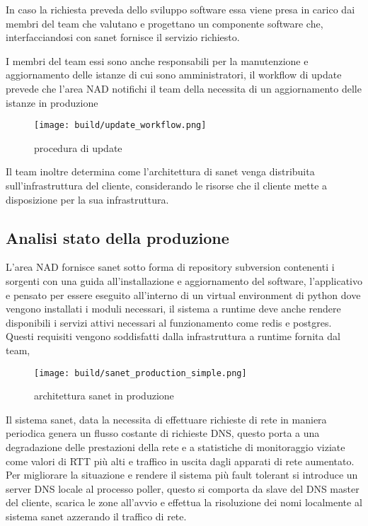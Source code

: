 \documentclass[12pt,a4paper,twoside,openright]{book}
\begin{document}
In caso la richiesta preveda dello sviluppo software essa viene presa in carico dai membri del team che valutano e progettano un componente software che, interfacciandosi con sanet fornisce il servizio richiesto.

I membri del team essi sono anche responsabili per la manutenzione e aggiornamento delle istanze di cui sono amministratori, il workflow di update prevede che l'area NAD notifichi il team della necessita di un aggiornamento delle istanze in produzione


\begin{figure}[H]
    \centering
    \texttt{[image: build/update\_workflow.png]}
    \caption{procedura di update}
    \label{fig:enter-label}
\end{figure}

Il team inoltre determina come l'architettura di sanet venga distribuita sull'infrastruttura del cliente, considerando le risorse che il cliente mette a disposizione per la sua infrastruttura.

\subsection{Analisi stato della produzione}

L'area NAD fornisce sanet sotto forma di repository subversion contenenti i sorgenti con una guida all'installazione e aggiornamento del software, l'applicativo e pensato per essere eseguito all'interno di un virtual environment di python dove vengono installati i moduli necessari, il sistema a runtime deve anche rendere disponibili i servizi attivi necessari al funzionamento come redis e postgres. Questi requisiti vengono soddisfatti dalla infrastruttura a runtime fornita dal team,

\begin{figure}[H]
    \centering
    \texttt{[image: build/sanet\_production\_simple.png]}
    \caption{architettura sanet in produzione}
    \label{fig:enter-label}
\end{figure}

Il sistema sanet, data la necessita di effettuare richieste di rete in maniera periodica genera un flusso costante di richieste DNS, questo porta a una degradazione delle prestazioni della rete e a statistiche di monitoraggio viziate come valori di RTT più alti e traffico in uscita dagli apparati di rete aumentato. Per migliorare la situazione e rendere il sistema più fault tolerant si introduce un server DNS locale al processo poller, questo si comporta da slave del DNS master del cliente, scarica le zone all'avvio e effettua la risoluzione dei nomi localmente al sistema sanet azzerando il traffico di rete.
\end{document}
